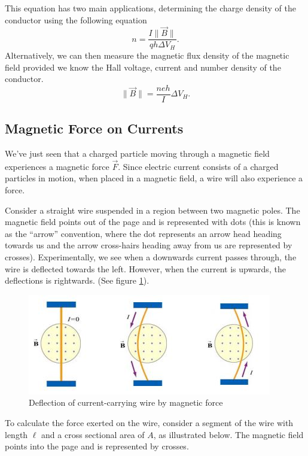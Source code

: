 This equation has two main applications, determining the charge density of the conductor using the following equation
\begin{equation}
    n = \frac{I\| \vec{B}\|}{qh\Delta V_H}.
\end{equation}
Alternatively, we can then measure the magnetic flux density of the magnetic field provided we know the Hall voltage, current and number density of the conductor.
\begin{equation}
    \| \vec{B} \| = \frac{neh}{I} \Delta V_H.
\end{equation}

\subsection{Magnetic Force on Currents}

We've just seen that a charged particle moving through a magnetic field experiences a magnetic force $\vec{F}$. Since electric current consists of a charged particles in motion, when placed in a magnetic field, a wire will also experience a force. 

Consider a straight wire suspended in a region between two magnetic poles. The magnetic field points out of the page and is represented with dots (this is known as the ``arrow'' convention, where the dot represents an arrow head heading towards us and the arrow cross-hairs heading away from us are represented by crosses). Experimentally, we see when a downwards current passes through, the wire is deflected towards the left. However, when the current is upwards, the deflections is rightwards. (See figure \ref{fig:magnetic-field-wire-1}).

\begin{figure}[h!]
    \centering
    \includegraphics{notes/images/Magnetic-Field-Wire-1.JPG}
    \caption{Deflection of current-carrying wire by magnetic force}
    \label{fig:magnetic-field-wire-1}
\end{figure}
\FloatBarrier

To calculate the force exerted on the wire, consider a segment of the wire with length $\ell$ and a cross sectional area of $A$, as illustrated below. The magnetic field points into the page and is represented by crosses. 

